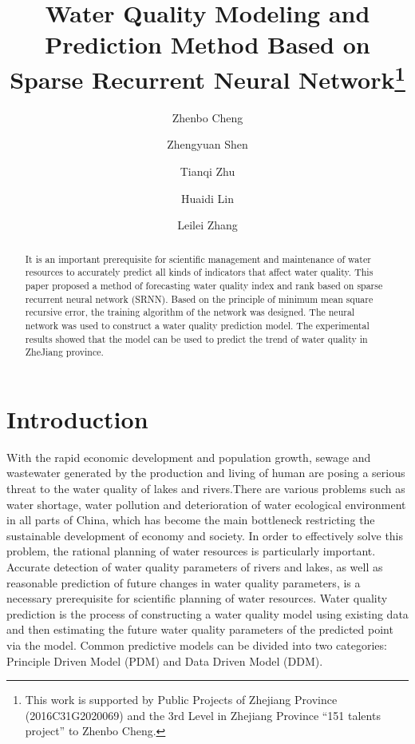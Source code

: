 \documentclass[runningheads]{llncs}
\begin{document}
%
\title{Water Quality Modeling and Prediction Method Based on Sparse Recurrent Neural Network\thanks{This work is supported by Public Projects of Zhejiang Province (2016C31G2020069) and the 3rd Level in Zhejiang Province “151 talents project” to Zhenbo Cheng.}}
%
%
\author{Zhenbo Cheng\inst{} \and
Zhengyuan Shen\inst{} \and
Tianqi Zhu\inst{}\and
Huaidi Lin\inst{}\and
Leilei Zhang\inst{}}
%
%
%
\maketitle              %
%
\begin{abstract}
It is an important prerequisite for scientific management and maintenance of water 
resources to accurately predict all kinds of indicators that affect water quality. 
This paper proposed a method of forecasting water quality index and rank based on sparse 
recurrent neural network (SRNN). Based on the principle of minimum mean square 
recursive error, the training algorithm of the network was designed. The neural network was used to construct a water quality prediction model. The experimental results showed that the model can be used to predict the 
 trend of water quality in ZheJiang province.


\end{abstract}
%
%
%

\section{Introduction}
With the rapid economic development and population growth, 
sewage and wastewater generated by the production and living of 
human are posing a serious threat to the water quality of lakes and 
rivers\cite{RN1}.There are various problems such as water shortage, water 
pollution and deterioration of water ecological environment in all 
parts of China\cite{RN1}, which has become the main bottleneck restricting the 
sustainable development of economy and society. In order to effectively solve this problem, the rational planning 
of water resources is particularly important\cite{RN2,RN3}. Accurate detection of water 
quality parameters of rivers and lakes, as well as reasonable prediction
of future changes in water quality parameters\cite{RN4}, is a necessary 
prerequisite for scientific planning of water resources. Water quality 
prediction is the process of constructing a water quality model using 
existing data and then estimating the future water quality parameters of 
the predicted point via the model. Common predictive models can be divided 
into two categories: Principle Driven Model (PDM) and Data Driven Model (DDM).
\end{document}
